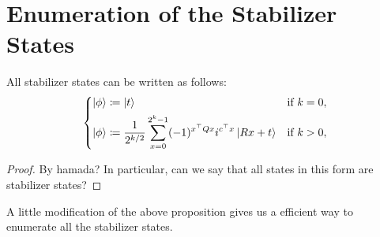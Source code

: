 \documentclass[\main/main]{subfiles}
\begin{document}
\section{Enumeration of the Stabilizer States}

\begin{proposition}
    All stabilizer states can be written as follows:
    \begin{equation}\label{eq:stabilizerStateStandardForm}
        \begin{dcases}
            \ket{\phi} \coloneqq \ket{t}                                                                       & \text{if $k=0$}, \\
            \ket{\phi} \coloneqq \frac{1}{2^{k/2}} \sum_{x=0}^{2^k-1}(-1)^{x^\top Q x} i^{c^\top x}\ket{R x+t} & \text{if $k>0$},
        \end{dcases}
    \end{equation}
\end{proposition}
\begin{proof}
    By hamada?
    In particular, can we say that all states in this form are stabilizer states?
\end{proof}

A little modification of the above proposition gives us
a efficient way to enumerate all the stabilizer states.
\end{document}
